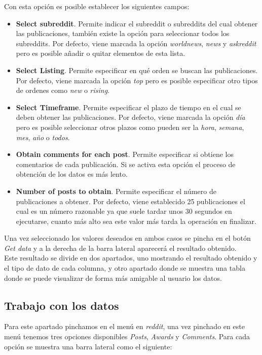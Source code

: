 \documentclass[../../main.tex]{subfiles}
\begin{document}
Con esta opción es posible establecer los siguientes campos:
\begin{itemize}
    \item \textbf{Select \Gls{subreddit}}. Permite indicar el \gls{subreddit} o \glspl{subreddit} del cual obtener las publicaciones, también existe la opción para seleccionar todos los subreddits. Por defecto, viene marcada la opción \textit{worldnews}, \textit{news} y \textit{askreddit} pero es posible añadir o quitar elementos de esta lista. 
    \item \textbf{Select Listing}. Permite especificar en qué orden se buscan las publicaciones. Por defecto, viene marcada la opción \textit{top} pero es posible especificar otro tipos de ordenes como \textit{new} o \textit{rising}.
    \item \textbf{Select Timeframe}. Permite especificar el plazo de tiempo en el cual se deben obtener las publicaciones. Por defecto, viene marcada la opción \textit{día} pero es posible seleccionar otros plazos como pueden ser la \textit{hora}, \textit{semana}, \textit{mes}, \textit{año} o \textit{todos}.
    \item \textbf{Obtain comments for each post}. Permite especificar si obtiene los comentarios de cada publicación. Si se activa esta opción el proceso de obtención de los datos es más lento.
    \item \textbf{Number of posts to obtain}. Permite especificar el número de publicaciones a obtener. Por defecto, viene establecido 25 publicaciones el cual es un número razonable ya que suele tardar unos 30 segundos en ejecutarse, cuanto más alto sea este valor más tarda la operación en finalizar.
\end{itemize}

Una vez seleccionado los valores deseados en ambos casos se pincha en el botón \textit{Get data} y a la derecha de la barra lateral aparecerá el resultado obtenido.  \\

Este resultado se divide en dos apartados, uno mostrando el resultado obtenido y el tipo de dato de cada columna, y otro apartado donde se muestra una tabla donde se puede visualizar de forma más amigable al usuario los datos.

\subsection{Trabajo con los datos}


Para este apartado pinchamos en el menú en \textit{\Gls{reddit}}, una vez pinchado en este menú tenemos tres opciones disponibles \textit{Posts}, \textit{Awards} y \textit{Comments}. Para cada opción se muestra una barra lateral como el siguiente:
\end{document}
